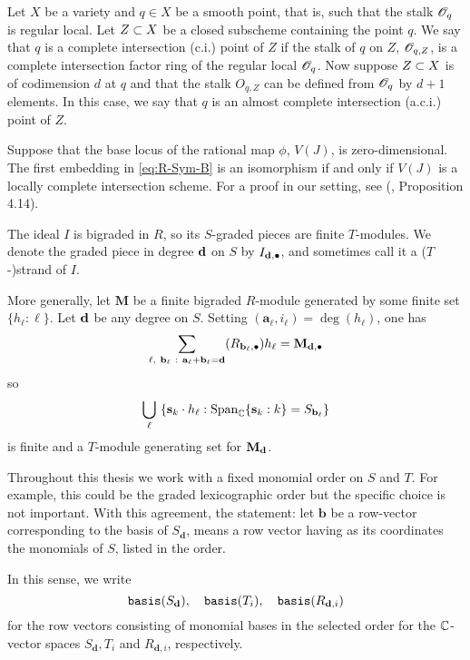 \documentclass[fleqn,reqno]{amsart}
\begin{document}
\begin{paragraf}
\label{par:ci-points}
Let $X$ be a variety and $q\in X$ be a smooth point, that is,
such that the stalk $\mathscr{O}_q$ is regular local.
Let $Z\subset X$ be a closed subscheme containing the point $q$.
We say that $q$ is a complete intersection (c.i.) point of $Z$
if the stalk of $q$ on $Z$, $\mathscr{O}_{q,Z}$,
is a complete intersection factor ring of the regular local $\mathscr{O}_q$.
Now suppose $Z\subset X$ is of codimension $d$ at $q$
and that the stalk $O_{q,Z}$ can be defined from $\mathscr{O}_q$ by $d+1$ elements.
In this case, we say that $q$ is an almost complete intersection (a.c.i.)
point of $Z$.
\end{paragraf}

\begin{paragraf}
\label{par:linear-type}
Suppose that the base locus of the rational map $\phi$, $V(J)$, is zero-dimensional.
The first embedding in \eqref{eq:R-Sym-B} is an isomorphism if and only if
$V(J)$ is a locally complete intersection scheme.
For a proof in our setting, see (\citet{BJ-03}, Proposition 4.14).
\end{paragraf}

\begin{paragraf}
\label{lemma:push-gens}
The ideal $I$ is bigraded in $R$, so its $S$-graded pieces are finite $T$-modules.
We denote the graded piece in degree $\mathbf d$ on $S$ by $I_{\mathbf d,\bullet}$,
and sometimes call it a ($T$-)strand of $I$.

More generally, let $\mathbf M$ be a finite bigraded $R$-module
generated by some finite set $\{h_\ell:\ell\}$.
Let $\mathbf d$ be any degree on $S$.
Setting $({\mathbf a}_\ell,i_\ell)=\deg(h_\ell)$, one has
\[
	\displaystyle\sum_{\ell,~{\mathbf b}_\ell~:~{\mathbf a}_\ell+{\mathbf b}_\ell=\mathbf d}
	(R_{{\mathbf b}_\ell,\bullet}) h_\ell={\mathbf M}_{\mathbf d,\bullet}
\]
so
\[
	\displaystyle\bigcup_{\ell}~\{\mathbf s_k\cdot h_\ell:\operatorname{Span}_{\mathbb{C}}\{\mathbf s_k:k\}=
	S_{{\mathbf b}_\ell}\}
\]
is finite and a $T$-module generating set for $\mathbf M_\mathbf d$.
\end{paragraf}

\begin{paragraf}
\label{par:basis}
Throughout this thesis we work with a fixed monomial order on $S$ and $T$.
For example, this could be the graded lexicographic order but the specific choice
is not important.
With this agreement,
the statement:
let $\mathbf b$ be a row-vector corresponding to the basis of $S_{\mathbf d}$,
means a row vector having as its coordinates the monomials of $S$,
listed in the order.

In this sense, we write
\[
\mathop{\tt basis}(S_{\mathbf d}),\quad\mathop{\tt basis}(T_i),\quad\mathop{\tt basis}(R_{\mathbf d,i})
\]
for the row vectors consisting of monomial bases in the selected order for the $\mathbb{C}$-vector spaces
$S_{\mathbf d}, T_i$  and $R_{\mathbf d,i}$, respectively.
\end{paragraf}
\end{document}
